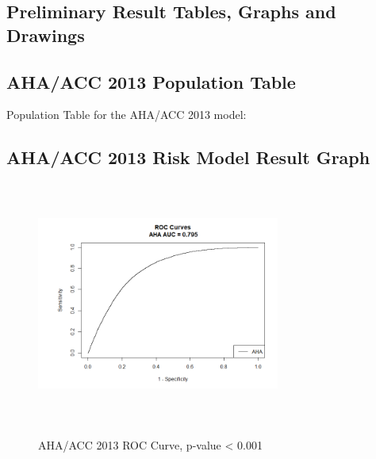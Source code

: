 \documentclass[a4paper,12pt]{article}
\begin{document}
\begin{appendices}
   		\section{Preliminary Result Tables, Graphs and Drawings}
   		
   		\subsection{AHA/ACC 2013 Population Table}
   		Population Table for the AHA/ACC 2013 model\cite{Goff2014}:
   		
   		
   		\subsection{AHA/ACC 2013 Risk Model  Result Graph}
   		\begin{figure}[H]
   			\includegraphics[width=8cm, height=8cm]{prelim-results/AHA/AHA_ROC.png}
   			\label{AHAROC}
   			\captionsetup{justification=justified,singlelinecheck=false,margin=1cm}
   			\caption{AHA/ACC 2013 ROC Curve, p-value < 0.001}
   		\end{figure}
   		

\end{appendices}
\end{document}
